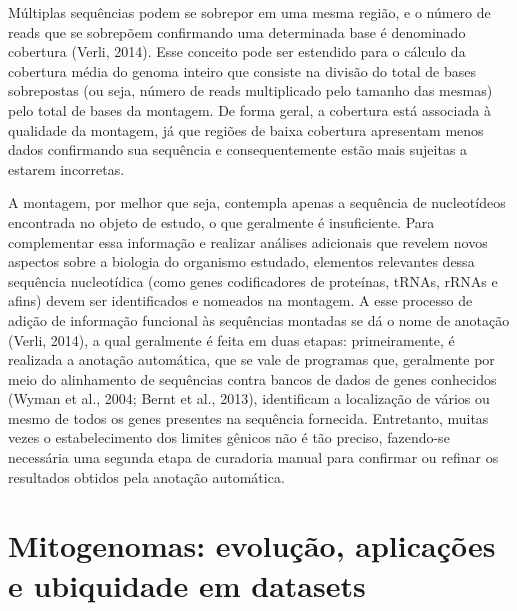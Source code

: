 \documentclass[../DISSERTACAO_MAIN.tex]{subfiles}
\begin{document}
Múltiplas sequências podem se sobrepor em uma mesma região, e o número de reads que se sobrepõem confirmando uma determinada base é denominado cobertura (Verli, 2014). Esse conceito pode ser estendido para o cálculo da cobertura média do genoma inteiro que consiste na divisão do total de bases sobrepostas (ou seja, número de reads multiplicado pelo tamanho das mesmas) pelo total de bases da montagem. De forma geral, a cobertura está associada à qualidade da montagem, já que regiões de baixa cobertura apresentam menos dados confirmando sua sequência e consequentemente estão mais sujeitas a estarem incorretas.

A montagem, por melhor que seja, contempla apenas a sequência de nucleotídeos encontrada no objeto de estudo, o que geralmente é insuficiente. Para complementar essa informação e realizar análises adicionais que revelem novos aspectos sobre a biologia do organismo estudado, elementos relevantes dessa sequência nucleotídica (como genes codificadores de proteínas, tRNAs, rRNAs e afins) devem ser identificados e nomeados na montagem. A esse processo de adição de informação funcional às sequências montadas se dá o nome de anotação (Verli, 2014), a qual geralmente é feita em duas etapas: primeiramente, é realizada a anotação automática, que se vale de programas que, geralmente por meio do alinhamento de sequências contra bancos de dados de genes conhecidos (Wyman et al., 2004; Bernt et al., 2013), identificam a localização de vários ou mesmo de todos os genes presentes na sequência fornecida. Entretanto, muitas vezes o estabelecimento dos limites gênicos não é tão preciso, fazendo-se necessária uma segunda etapa de curadoria manual para confirmar ou refinar os resultados obtidos pela anotação automática.

\section{Mitogenomas: evolução, aplicações e ubiquidade em datasets}
\end{document}
